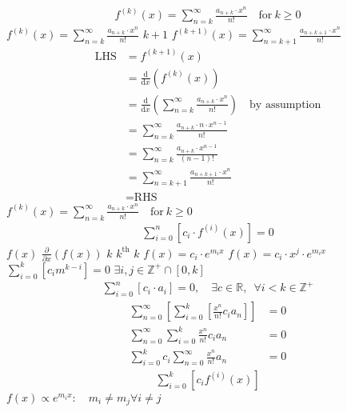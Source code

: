 \documentclass{article}
\begin{document}
\begin{align}
f^{(k)}\left(x\right) = \sum_{n=k}^\infty\frac{a_{n+k}\cdot x^n}{n!} \quad \text{for}~k \ge 0
\end{align}
$f^{(k)}\left(x\right) = \sum_{n=k}^\infty\frac{a_{n+k}\cdot x^n}{n!}$
$k+1$
$f^{(k+1)}(x) = \sum_{n=k+1}^\infty\frac{a_{n+k+1}\cdot x^n}{n!}$
\begin{align*}
    \text{LHS} &= f^{(k+1)}(x)\\
    &= \frac{\mathrm{d}}{\mathrm{d}x}\left(f^{(k)}(x)\right)\\
    &= \frac{\mathrm{d}}{\mathrm{d}x}\left(\sum_{n=k}^\infty\frac{a_{n+k}\cdot x^n}{n!}\right)\quad \text{by assumption}\\
    &= \sum_{n=k}^\infty\frac{a_{n+k}\cdot n\cdot x^{n-1}}{n!}\\
    &= \sum_{n=k}^\infty\frac{a_{n+k}\cdot x^{n-1}}{(n-1)!}\\
    &= \sum_{n=k+1}^\infty\frac{a_{n+k+1}\cdot x^{n}}{n!}\\
    &= \text{RHS}
\end{align*}
$f^{(k)}\left(x\right) = \sum_{n=k}^\infty\frac{a_{n+k}\cdot x^n}{n!} \quad \text{for}~k \ge 0$
\begin{align}
\sum^{n}_{i=0} \left[ c_{i} \cdot f^{(i)}(x) \right] = 0 \label{eq:hom-ode}
\end{align}
$f(x)$
$\frac{\partial }{\partial x}{\left({ f{\left({ x }\right)} }\right)}$
$k$
$k^{\mathrm{th}}$
$k$
$f(x)=c_{i} \cdot e^{m_{i}x}$
$f(x)=c_{i} \cdot x^{j}\cdot e^{m_{i}x}$
$\sum^{k}_{i=0}\left[  c_{i}m^{k-i} \right] = 0$
$\exists i,j \in \mathbb{Z}^{+} \cap \left[0,k\right]$
\begin{align}
\sum^{n}_{i= 0}   \left[ c_i \cdot  a_i \right] = 0, \quad \exists c \in
\mathbb{R}, \enspace \forall i<k\in\mathbb{Z}^+ \nonumber \label{eq:recurrence-relation-def}
\end{align}
\begin{align}
    \sum^{\infty}_{n= 0}   \left[ \sum^{k}_{i= 0}   \left[ \frac{x^n}{n!} c_i a_n \right]  \right]  &= 0 \\
    \sum^{\infty}_{n= 0}    \sum^{k}_{i= 0}    \frac{x^n}{n!} c_i a_n    &= 0 \\
        \sum^{k}_{i= 0} c_i \sum^{\infty}_{n= 0}    \frac{x^n}{n!}  a_n    &= 0
\end{align}
\begin{align}
   \sum^{k}_{i= 0}   \left[ c_i f^{\left( i \right)}\left( x \right) \right]
\end{align}
$f{\left({ x }\right)} \propto e^{m_i x}: \quad m_i \neq m_j \forall i\neq j$
\end{document}
